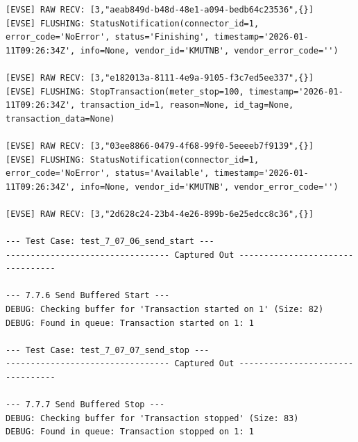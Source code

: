 \documentclass{article}
\begin{document}
\begin{lstlisting}
[EVSE] RAW RECV: [3,"aeab849d-b48d-48e1-a094-bedb64c23536",{}]
[EVSE] FLUSHING: StatusNotification(connector_id=1, error_code='NoError', status='Finishing', timestamp='2026-01-11T09:26:34Z', info=None, vendor_id='KMUTNB', vendor_error_code='')

[EVSE] RAW RECV: [3,"e182013a-8111-4e9a-9105-f3c7ed5ee337",{}]
[EVSE] FLUSHING: StopTransaction(meter_stop=100, timestamp='2026-01-11T09:26:34Z', transaction_id=1, reason=None, id_tag=None, transaction_data=None)

[EVSE] RAW RECV: [3,"03ee8866-0479-4f68-99f0-5eeeeb7f9139",{}]
[EVSE] FLUSHING: StatusNotification(connector_id=1, error_code='NoError', status='Available', timestamp='2026-01-11T09:26:34Z', info=None, vendor_id='KMUTNB', vendor_error_code='')

[EVSE] RAW RECV: [3,"2d628c24-23b4-4e26-899b-6e25edcc8c36",{}]

--- Test Case: test_7_07_06_send_start ---
--------------------------------- Captured Out ---------------------------------

--- 7.7.6 Send Buffered Start ---
DEBUG: Checking buffer for 'Transaction started on 1' (Size: 82)
DEBUG: Found in queue: Transaction started on 1: 1

--- Test Case: test_7_07_07_send_stop ---
--------------------------------- Captured Out ---------------------------------

--- 7.7.7 Send Buffered Stop ---
DEBUG: Checking buffer for 'Transaction stopped' (Size: 83)
DEBUG: Found in queue: Transaction stopped on 1: 1

\end{lstlisting}
\end{document}
